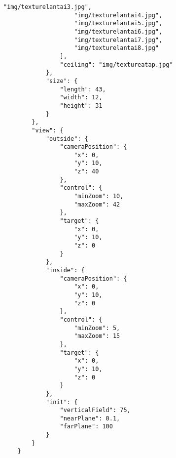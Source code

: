 \begin{lstlisting}[caption={Contoh JSON untuk ruangan kelas pada saat ujian.}, label={lst:json},captionpos=b]
                    "img/texturelantai3.jpg",
                    "img/texturelantai4.jpg",
                    "img/texturelantai5.jpg",
                    "img/texturelantai6.jpg",
                    "img/texturelantai7.jpg",
                    "img/texturelantai8.jpg"
                ],
                "ceiling": "img/textureatap.jpg"
            },
            "size": {
                "length": 43,
                "width": 12,
                "height": 31
            }
        },
        "view": {
            "outside": {
                "cameraPosition": {
                    "x": 0,
                    "y": 10,
                    "z": 40
                },
                "control": {
                    "minZoom": 10,
                    "maxZoom": 42
                },
                "target": {
                    "x": 0,
                    "y": 10,
                    "z": 0
                }
            },
            "inside": {
                "cameraPosition": {
                    "x": 0,
                    "y": 10,
                    "z": 0
                },
                "control": {
                    "minZoom": 5,
                    "maxZoom": 15
                },
                "target": {
                    "x": 0,
                    "y": 10,
                    "z": 0
                }
            },
            "init": {
                "verticalField": 75,
                "nearPlane": 0.1,
                "farPlane": 100
            }
        } 
    }
\end{lstlisting}

